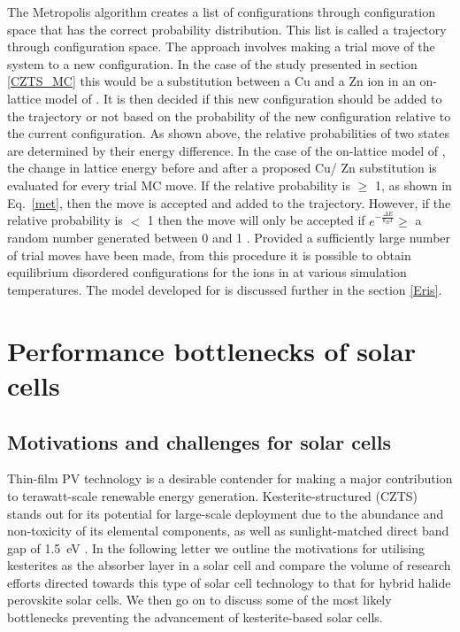 \documentclass[11pt, twoside]{report}
\begin{document}
The Metropolis algorithm creates a list of configurations through configuration space that has the correct probability distribution. This list is called a trajectory through configuration space. The approach involves making a trial move of the system to a new configuration. In the case of the study presented in section \ref{CZTS_MC} \cite{eris_paper} this would be a substitution between a Cu and a Zn ion in an on-lattice model of {\CZTS}. It is then decided if this new configuration should be added to the trajectory or not based on the probability of the new configuration relative to the current configuration. As shown above, the relative probabilities of two states are determined by their energy difference. In the case of the on-lattice model of {\CZTS}, the change in lattice energy before and after a proposed Cu/ Zn substitution is evaluated for every trial MC move. If the relative probability is  $\geq$ 1, as shown in Eq.~\ref{met}, then the move is accepted and added to the trajectory. However, if the relative probability is $<$ 1 then the move will only be accepted if $e^{-\frac{\Delta E}{k_BT}} \ge$ a random number generated between 0 and 1 \cite{Lesar3}. Provided a sufficiently large number of trial moves have been made, from this procedure it is possible to obtain equilibrium disordered configurations for the ions in {\CZTS} at various simulation temperatures. The model developed for {\CZTS} is discussed further in the section \ref{Eris}.






\chapter{Performance bottlenecks of {\CZTS} solar cells}\label{chap:CZTS}
\section{Motivations and challenges for {\CZTS} solar cells}
Thin-film PV technology is a desirable contender for making a major contribution to terawatt-scale renewable energy generation. Kesterite-structured {\CZTS} (CZTS) stands out for its potential for large-scale deployment due to the abundance and non-toxicity of its elemental components, as well as sunlight-matched direct band gap of \SI{1.5}{eV} \cite{CZTS_rev}. In the following letter we outline the motivations for utilising kesterites as the absorber layer in a solar cell and compare the volume of research efforts directed towards this type of solar cell technology to that for hybrid halide perovskite solar cells. We then go on to discuss some of the most likely bottlenecks preventing the advancement of kesterite-based solar cells. 
\end{document}

